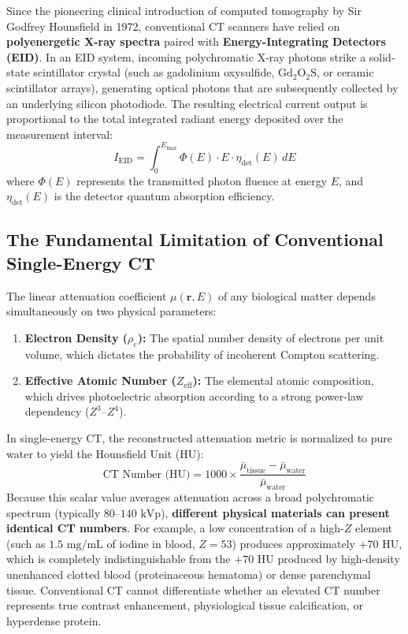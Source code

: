 \documentclass[11pt,a4paper]{article}
\begin{document}
Since the pioneering clinical introduction of computed tomography by Sir Godfrey Hounsfield in 1972, conventional CT scanners have relied on \textbf{polyenergetic X-ray spectra} paired with \textbf{Energy-Integrating Detectors (EID)}. In an EID system, incoming polychromatic X-ray photons strike a solid-state scintillator crystal (such as gadolinium oxysulfide, $\text{Gd}_2\text{O}_2\text{S}$, or ceramic scintillator arrays), generating optical photons that are subsequently collected by an underlying silicon photodiode. The resulting electrical current output is proportional to the total integrated radiant energy deposited over the measurement interval:
\begin{equation}
    I_{\text{EID}} = \int_{0}^{E_{\text{max}}} \Phi(E) \cdot E \cdot \eta_{\text{det}}(E) \, dE
\end{equation}
where $\Phi(E)$ represents the transmitted photon fluence at energy $E$, and $\eta_{\text{det}}(E)$ is the detector quantum absorption efficiency.

\subsection{The Fundamental Limitation of Conventional Single-Energy CT}
The linear attenuation coefficient $\mu(\mathbf{r}, E)$ of any biological matter depends simultaneously on two physical parameters:
\begin{enumerate}
    \item \textbf{Electron Density ($\rho_e$):} The spatial number density of electrons per unit volume, which dictates the probability of incoherent Compton scattering.
    \item \textbf{Effective Atomic Number ($Z_{\text{eff}}$):} The elemental atomic composition, which drives photoelectric absorption according to a strong power-law dependency ($Z^3\text{--}Z^4$).
\end{enumerate}

In single-energy CT, the reconstructed attenuation metric is normalized to pure water to yield the Hounsfield Unit (HU):
\begin{equation}
    \text{CT Number (HU)} = 1000 \times \frac{\bar{\mu}_{\text{tissue}} - \bar{\mu}_{\text{water}}}{\bar{\mu}_{\text{water}}}
\end{equation}
Because this scalar value averages attenuation across a broad polychromatic spectrum (typically $80\text{--}140\text{ kVp}$), \textbf{different physical materials can present identical CT numbers}. For example, a low concentration of a high-$Z$ element (such as $1.5\text{ mg/mL}$ of iodine in blood, $Z = 53$) produces approximately $+70\text{ HU}$, which is completely indistinguishable from the $+70\text{ HU}$ produced by high-density unenhanced clotted blood (proteinaceous hematoma) or dense parenchymal tissue. Conventional CT cannot differentiate whether an elevated CT number represents true contrast enhancement, physiological tissue calcification, or hyperdense protein.
\end{document}
